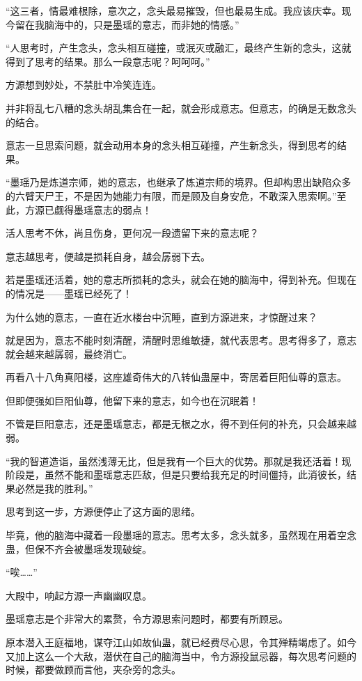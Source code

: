 \begin{this_body}
“这三者，情最难根除，意次之，念头最易摧毁，但也最易生成。我应该庆幸。现今留在我脑海中的，只是墨瑶的意志，而非她的情感。”

“人思考时，产生念头，念头相互碰撞，或泯灭或融汇，最终产生新的念头，这就得到了思考的结果。那么一段意志呢？呵呵呵。”

方源想到妙处，不禁肚中冷笑连连。

并非将乱七八糟的念头胡乱集合在一起，就会形成意志。但意志，的确是无数念头的结合。

意志一旦思索问题，就会动用本身的念头相互碰撞，产生新念头，得到思考的结果。

“墨瑶乃是炼道宗师，她的意志，也继承了炼道宗师的境界。但却构思出缺陷众多的六臂天尸王，不是因为她能力有限，而是顾及自身安危，不敢深入思索啊。”至此，方源已觑得墨瑶意志的弱点！

活人思考不休，尚且伤身，更何况一段遗留下来的意志呢？

意志越思考，便越是损耗自身，越会孱弱下去。

若是墨瑶还活着，她的意志所损耗的念头，就会在她的脑海中，得到补充。但现在的情况是——墨瑶已经死了！

为什么她的意志，一直在近水楼台中沉睡，直到方源进来，才惊醒过来？

就是因为，意志不能时刻清醒，清醒时思维敏捷，就代表思考。思考得多了，意志就会越来越孱弱，最终消亡。

再看八十八角真阳楼，这座雄奇伟大的八转仙蛊屋中，寄居着巨阳仙尊的意志。

但即便强如巨阳仙尊，他留下来的意志，如今也在沉眠着！

不管是巨阳意志，还是墨瑶意志，都是无根之水，得不到任何的补充，只会越来越弱。

“我的智道造诣，虽然浅薄无比，但是我有一个巨大的优势。那就是我还活着！现阶段是，虽然不能和墨瑶意志匹敌，但是只要给我充足的时间僵持，此消彼长，结果必然是我的胜利。”

思考到这一步，方源便停止了这方面的思绪。

毕竟，他的脑海中藏着一段墨瑶的意志。思考太多，念头就多，虽然现在用着空念蛊，但保不齐会被墨瑶发现破绽。

“唉……”

大殿中，响起方源一声幽幽叹息。

墨瑶意志是个非常大的累赘，令方源思索问题时，都要有所顾忌。

原本潜入王庭福地，谋夺江山如故仙蛊，就已经费尽心思，令其殚精竭虑了。如今又加上这么一个大敌，潜伏在自己的脑海当中，令方源投鼠忌器，每次思考问题的时候，都要做顾而言他，夹杂旁的念头。


\end{this_body}

